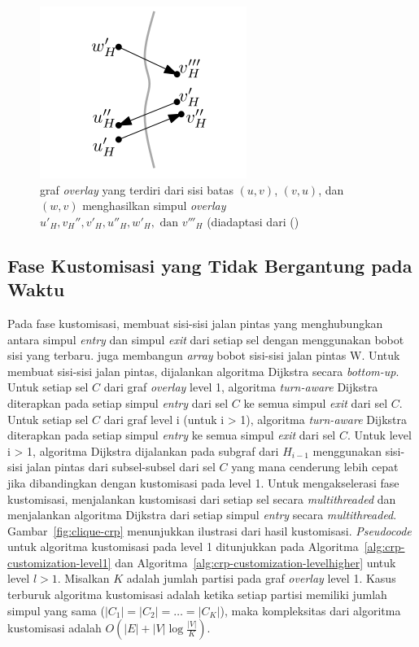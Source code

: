 \begin{figure}[H]
    \centering
    \includegraphics[]{figures/overlay_crp.png}
    \caption{graf \textit{overlay} yang terdiri dari sisi batas $(u,v)$, $(v,u)$, dan $(w,v)$ menghasilkan simpul \textit{overlay} $u'_{H},v_H'',v'_H,u''_H,w'_H, \text{ dan }v'''_H$ (diadaptasi dari (\cite{Delling2015})}
    \label{fig:crp-overlay2}
\end{figure}




\subsection{Fase Kustomisasi yang Tidak Bergantung pada Waktu}
\label{subsec:tdcrp-kustomisasi}
Pada fase kustomisasi, \cite{Delling2015} membuat sisi-sisi jalan pintas yang menghubungkan antara simpul \textit{entry} dan simpul \textit{exit} dari setiap sel dengan menggunakan bobot sisi yang terbaru. \cite{Delling2015} juga membangun \textit{array} bobot sisi-sisi jalan pintas W. Untuk membuat sisi-sisi jalan pintas, dijalankan algoritma Dijkstra secara \textit{bottom-up}. Untuk setiap sel $C$ dari graf \textit{overlay} level 1, algoritma \textit{turn-aware} Dijkstra diterapkan pada setiap simpul \textit{entry} dari sel $C$ ke semua simpul \textit{exit} dari sel $C$. Untuk setiap sel $C$ dari graf level i (untuk i > 1), algoritma \textit{turn-aware} Dijkstra diterapkan pada setiap simpul \textit{entry} ke semua simpul \textit{exit} dari sel $C$. Untuk level i > 1, algoritma Dijkstra dijalankan pada subgraf dari $H_{i-1}$ menggunakan sisi-sisi jalan pintas dari subsel-subsel dari sel $C$ yang mana cenderung lebih cepat jika dibandingkan dengan kustomisasi pada level 1. Untuk mengakselerasi fase kustomisasi, \cite{Delling2015} menjalankan kustomisasi dari setiap sel secara \textit{multithreaded} dan menjalankan algoritma Dijkstra dari setiap simpul \textit{entry} secara \textit{multithreaded}. Gambar~\ref{fig:clique-crp} menunjukkan ilustrasi dari hasil kustomisasi. \textit{Pseudocode} untuk algoritma kustomisasi pada level 1 ditunjukkan pada Algoritma~\ref{alg:crp-customization-level1} dan Algoritma~\ref{alg:crp-customization-levelhigher} untuk level $l>1$. Misalkan $K$ adalah jumlah partisi pada graf \textit{overlay} level 1. Kasus terburuk algoritma kustomisasi adalah ketika setiap partisi memiliki jumlah simpul yang sama ($|C_1|=|C_2|=\ldots =|C_K|$), maka kompleksitas dari algoritma kustomisasi adalah $O(|E|+|V|\log \frac{|V|}{K})$.

